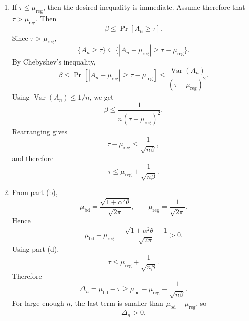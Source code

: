 \documentclass[11pt]{article}
\begin{document}
\begin{solution}
\begin{enumerate}[label=(\alph*)]
For
\[
   A_n := \frac{1}{n}\sum_{i=1}^n \operatorname{ReLU}(Z_i),
\]
we have
\[
    \mathbb E[A_n]
    =
    \frac{1}{n}\sum_{i=1}^n
    \mathbb E[\operatorname{ReLU}(Z_i)]
    =
    \frac{\sigma}{\sqrt{2\pi}}.
\]
Since the \(Z_i\) are independent,
\[
\begin{aligned}
    \operatorname{Var}(A_n)
    &=
    \operatorname{Var}
    \left(
        \frac{1}{n}\sum_{i=1}^n \operatorname{ReLU}(Z_i)
    \right) \\
    &=
    \frac{1}{n^2}
    \sum_{i=1}^n
    \operatorname{Var}(\operatorname{ReLU}(Z_i)) \\
    &\leq
    \frac{1}{n^2}\cdot n\sigma^2
    =
    \frac{\sigma^2}{n}.
\end{aligned}
\]

\item
If \(\tau\leq \mu_{\text{reg}}\), then the desired inequality is immediate.
Assume therefore that \(\tau>\mu_{\text{reg}}\). Then
\[
    \beta
    \leq
    \Pr[A_n\geq \tau].
\]
Since \(\tau>\mu_{\text{reg}}\),
\[
    \{A_n\geq \tau\}
    \subseteq
    \{|A_n-\mu_{\text{reg}}|\geq \tau-\mu_{\text{reg}}\}.
\]
By Chebyshev's inequality,
\[
    \beta
    \leq
    \Pr\left[
        |A_n-\mu_{\text{reg}}|
        \geq
        \tau-\mu_{\text{reg}}
    \right]
    \leq
    \frac{\operatorname{Var}(A_n)}
    {(\tau-\mu_{\text{reg}})^2}.
\]
Using \(\operatorname{Var}(A_n)\leq 1/n\), we get
\[
    \beta
    \leq
    \frac{1}{n(\tau-\mu_{\text{reg}})^2}.
\]
Rearranging gives
\[
    \tau-\mu_{\text{reg}}
    \leq
    \frac{1}{\sqrt{n\beta}},
\]
and therefore
\[
    \tau
    \leq
    \mu_{\text{reg}}
    +
    \frac{1}{\sqrt{n\beta}}.
\]

\item
From part (b),
\[
    \mu_{\mathrm{bd}}
    =
    \frac{\sqrt{1+\alpha^2\theta}}{\sqrt{2\pi}},
    \qquad
    \mu_{\mathrm{reg}}
    =
    \frac{1}{\sqrt{2\pi}}.
\]
Hence
\[
    \mu_{\mathrm{bd}}-\mu_{\mathrm{reg}}
    =
    \frac{\sqrt{1+\alpha^2\theta}-1}{\sqrt{2\pi}}
    >
    0.
\]
Using part (d),
\[
    \tau
    \leq
    \mu_{\mathrm{reg}}
    +
    \frac{1}{\sqrt{n\beta}}.
\]
Therefore
\[
    \Delta_n
    =
    \mu_{\mathrm{bd}}-\tau
    \geq
    \mu_{\mathrm{bd}}
    -
    \mu_{\mathrm{reg}}
    -
    \frac{1}{\sqrt{n\beta}}.
\]
For large enough \(n\), the last term is smaller than
\(\mu_{\mathrm{bd}}-\mu_{\mathrm{reg}}\), so
\[
    \Delta_n>0.
\]


\end{enumerate}
\end{solution}
\end{document}
